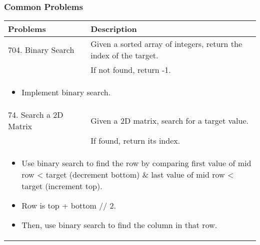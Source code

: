 \subsubsection{Common Problems}
\begin{summary}
    \begin{center}
        \begin{tabular}{ll}
            \toprule
            \textbf{Problems} & \textbf{Description} \\
            \midrule
            704. Binary Search & Given a sorted array of integers, return the index of the target. \\
            & If not found, return -1. \\
            \multicolumn{2}{p{\linewidth}}{
                \begin{itemize}
                    \item Implement binary search.
                \end{itemize}
            } \\
            \midrule
            74. Search a 2D Matrix & Given a 2D matrix, search for a target value. \\
            & If found, return its index. \\
            \multicolumn{2}{p{\linewidth}}{
                \begin{itemize}
                    \item Use binary search to find the row by comparing first value of mid row < target (decrement bottom) \& last value of mid row < target (increment top).
                    \item Row is top + bottom // 2.
                    \item Then, use binary search to find the column in that row.
                \end{itemize}
            } \\
            \bottomrule
        \end{tabular}
    \end{center}
\end{summary}

